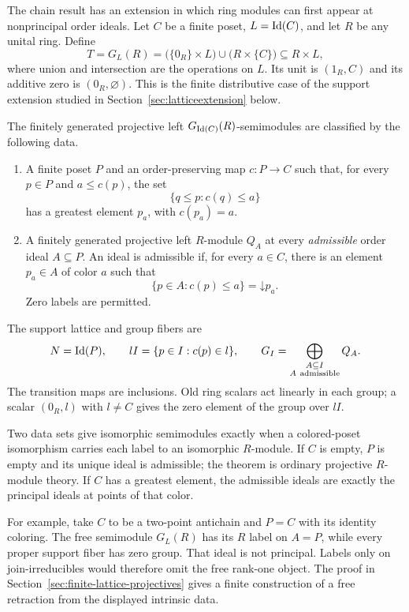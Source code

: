 The chain result has an extension in which ring modules can first appear
at nonprincipal order ideals. Let $C$ be a finite poset,
$L=\operatorname{Id}(C)$, and let $R$ be any unital ring. Define
\[
 T=G_L(R)=\bigl(\{0_R\}\times L\bigr)\cup\bigl(R\times\{C\}\bigr)
 \subseteq R\times L,
\]
where union and intersection are the operations on $L$.
Its unit is $(1_R,C)$ and its additive zero is $(0_R,\varnothing)$.
This is the finite distributive case of the support extension studied
in Section~\ref{sec:latticeextension} below.

\begin{theorem}
\label{thm:finite-lattice-projectives}
The finitely generated projective left $G_{\operatorname{Id}(C)}(R)$-semimodules are
classified by the following data.
\begin{enumerate}
\item A finite poset $P$ and an order-preserving map $c:P\to C$ such that,
for every $p\in P$ and $a\le c(p)$, the set
\[
 \{q\le p:c(q)\le a\}
\]
has a greatest element $p_a$, with $c(p_a)=a$.
\item A finitely generated projective left $R$-module $Q_A$ at every
\emph{admissible} order ideal $A\subseteq P$. An ideal is admissible if,
for every $a\in C$, there is an element $p_a\in A$ of color $a$ such that
\begin{equation}\label{eq:admissible-ideal}
 \{p\in A:c(p)\le a\}=\mathord\downarrow p_a.
\end{equation}
Zero labels are permitted.
\end{enumerate}
The support lattice and group fibers are
\[
 N=\Id(P),\qquad lI=\{p\in I:c(p)\in l\},\qquad
 G_I=\bigoplus_{\substack{A\subseteq I\\A\ \mathrm{admissible}}}Q_A.
\]
The transition maps are inclusions. Old ring scalars act linearly in
each group; a scalar $(0_R,l)$ with $l\ne C$ gives the zero element of
the group over $lI$.

Two data sets give isomorphic semimodules exactly when a colored-poset
isomorphism carries each label to an isomorphic $R$-module. If $C$ is
empty, $P$ is empty and its unique ideal is admissible; the theorem is
ordinary projective $R$-module theory. If $C$ has a greatest element,
the admissible ideals are exactly the principal ideals at points of
that color.
\end{theorem}

For example, take $C$ to be a two-point antichain and $P=C$ with its
identity coloring. The free semimodule $G_L(R)$ has its $R$ label on
$A=P$, while every proper support fiber has zero group. That ideal is
not principal. Labels only on join-irreducibles would therefore omit
the free rank-one object. The proof in
Section~\ref{sec:finite-lattice-projectives} gives a finite construction
of a free retraction from the displayed intrinsic data.
